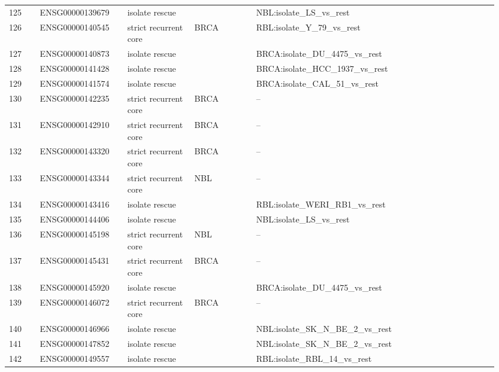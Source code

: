 \begin{landscape}
{\begin{longtable}{p{0.06\linewidth}p{0.17\linewidth}p{0.13\linewidth}p{0.12\linewidth}p{0.47\linewidth}}
125 & ENSG00000139679 & isolate rescue &  & NBL:isolate\_\allowbreak{}LS\_\allowbreak{}vs\_\allowbreak{}rest \\
126 & ENSG00000140545 & strict recurrent core & BRCA & RBL:isolate\_\allowbreak{}Y\_\allowbreak{}79\_\allowbreak{}vs\_\allowbreak{}rest \\
127 & ENSG00000140873 & isolate rescue &  & BRCA:isolate\_\allowbreak{}DU\_\allowbreak{}4475\_\allowbreak{}vs\_\allowbreak{}rest \\
128 & ENSG00000141428 & isolate rescue &  & BRCA:isolate\_\allowbreak{}HCC\_\allowbreak{}1937\_\allowbreak{}vs\_\allowbreak{}rest \\
129 & ENSG00000141574 & isolate rescue &  & BRCA:isolate\_\allowbreak{}CAL\_\allowbreak{}51\_\allowbreak{}vs\_\allowbreak{}rest \\
130 & ENSG00000142235 & strict recurrent core & BRCA & -- \\
131 & ENSG00000142910 & strict recurrent core & BRCA & -- \\
132 & ENSG00000143320 & strict recurrent core & BRCA & -- \\
133 & ENSG00000143344 & strict recurrent core & NBL & -- \\
134 & ENSG00000143416 & isolate rescue &  & RBL:isolate\_\allowbreak{}WERI\_\allowbreak{}RB1\_\allowbreak{}vs\_\allowbreak{}rest \\
135 & ENSG00000144406 & isolate rescue &  & NBL:isolate\_\allowbreak{}LS\_\allowbreak{}vs\_\allowbreak{}rest \\
136 & ENSG00000145198 & strict recurrent core & NBL & -- \\
137 & ENSG00000145431 & strict recurrent core & BRCA & -- \\
138 & ENSG00000145920 & isolate rescue &  & BRCA:isolate\_\allowbreak{}DU\_\allowbreak{}4475\_\allowbreak{}vs\_\allowbreak{}rest \\
139 & ENSG00000146072 & strict recurrent core & BRCA & -- \\
140 & ENSG00000146966 & isolate rescue &  & NBL:isolate\_\allowbreak{}SK\_\allowbreak{}N\_\allowbreak{}BE\_\allowbreak{}2\_\allowbreak{}vs\_\allowbreak{}rest \\
141 & ENSG00000147852 & isolate rescue &  & NBL:isolate\_\allowbreak{}SK\_\allowbreak{}N\_\allowbreak{}BE\_\allowbreak{}2\_\allowbreak{}vs\_\allowbreak{}rest \\
142 & ENSG00000149557 & isolate rescue &  & RBL:isolate\_\allowbreak{}RBL\_\allowbreak{}14\_\allowbreak{}vs\_\allowbreak{}rest \\

\end{longtable}}
\end{landscape}
